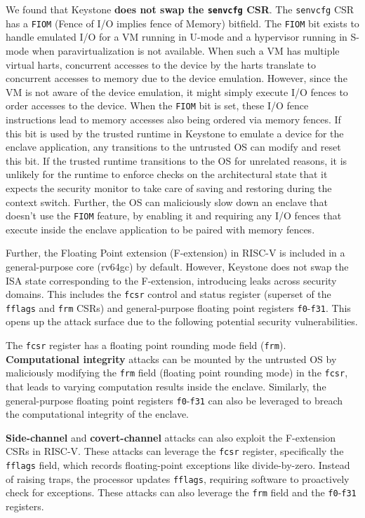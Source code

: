 We found that Keystone \textbf{does not swap the \texttt{senvcfg} CSR}. 
The \texttt{senvcfg} CSR has a \texttt{FIOM} (Fence of I/O implies fence of Memory) bitfield. 
The \texttt{FIOM} bit exists to handle emulated I/O for a VM running in U-mode and a hypervisor running in S-mode when paravirtualization is not available. 
When such a VM has multiple virtual harts, concurrent accesses to the device by the harts translate to concurrent accesses to memory due to the device emulation. 
However, since the VM is not aware of the device emulation, it might simply execute I/O fences to order accesses to the device. 
When the \texttt{FIOM} bit is set, these I/O fence instructions lead to memory accesses also being ordered via memory fences. 
If this bit is used by the trusted runtime in Keystone to emulate a device for the enclave application, any transitions to the untrusted OS can modify and reset this bit. 
If the trusted runtime transitions to the OS for unrelated reasons, it is unlikely for the runtime to enforce checks on the architectural state that it expects the security monitor to take care of saving and restoring during the context switch. 
Further, the OS can maliciously slow down an enclave that doesn't use the \texttt{FIOM} feature, by enabling it and requiring any I/O fences that execute inside the enclave application to be paired with memory fences. 

Further, the Floating Point extension (F-extension) in RISC-V is included in a general-purpose core (rv64gc) by default. 
However, Keystone does not swap the ISA state corresponding to the F-extension, introducing leaks across security domains. 
This includes the \texttt{fcsr} control and status register (superset of the \texttt{fflags} and \texttt{frm} CSRs) and general-purpose floating point registers \ie{} \texttt{f0}-\texttt{f31}.  
This opens up the attack surface due to the following potential security vulnerabilities.

The \texttt{fcsr} register has a floating point rounding mode field (\texttt{frm}).
\textbf{Computational integrity} attacks can be mounted by the untrusted OS by maliciously modifying the \texttt{frm} field (floating point rounding mode) in the \texttt{fcsr}, that leads to varying computation results inside the enclave. 
Similarly, the general-purpose floating point registers \ie{} \texttt{f0}-\texttt{f31} can also be leveraged to breach the computational integrity of the enclave.

\textbf{Side-channel} and \textbf{covert-channel} attacks can also exploit the F-extension CSRs in RISC-V.
These attacks can leverage the 
\texttt{fcsr} register, specifically the \texttt{fflags} field, which records floating-point exceptions like divide-by-zero. Instead of raising traps, the processor updates \texttt{fflags}, requiring software to proactively check for exceptions. 
These attacks can also leverage the \texttt{frm} field and the \texttt{f0}-\texttt{f31} registers. 




